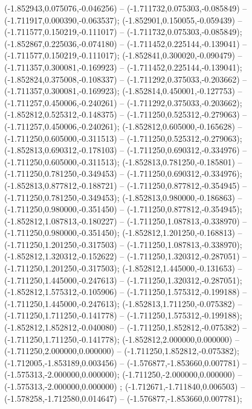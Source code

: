  (-1.852943,0.075076,-0.046256) -- (-1.711732,0.075303,-0.085849) -- (-1.711917,0.000390,-0.063537);
 (-1.852901,0.150055,-0.059439) -- (-1.711577,0.150219,-0.111017) -- (-1.711732,0.075303,-0.085849);
 (-1.852867,0.225036,-0.074180) -- (-1.711452,0.225144,-0.139041) -- (-1.711577,0.150219,-0.111017);
 (-1.852841,0.300020,-0.090479) -- (-1.711357,0.300081,-0.169923) -- (-1.711452,0.225144,-0.139041);
 (-1.852824,0.375008,-0.108337) -- (-1.711292,0.375033,-0.203662) -- (-1.711357,0.300081,-0.169923);
 (-1.852814,0.450001,-0.127753) -- (-1.711257,0.450006,-0.240261) -- (-1.711292,0.375033,-0.203662);
 (-1.852812,0.525312,-0.148375) -- (-1.711250,0.525312,-0.279063) -- (-1.711257,0.450006,-0.240261);
 (-1.852812,0.605000,-0.165628) -- (-1.711250,0.605000,-0.311513) -- (-1.711250,0.525312,-0.279063);
 (-1.852813,0.690312,-0.178103) -- (-1.711250,0.690312,-0.334976) -- (-1.711250,0.605000,-0.311513);
 (-1.852813,0.781250,-0.185801) -- (-1.711250,0.781250,-0.349453) -- (-1.711250,0.690312,-0.334976);
 (-1.852813,0.877812,-0.188721) -- (-1.711250,0.877812,-0.354945) -- (-1.711250,0.781250,-0.349453);
 (-1.852813,0.980000,-0.186863) -- (-1.711250,0.980000,-0.351450) -- (-1.711250,0.877812,-0.354945);
 (-1.852812,1.087813,-0.180227) -- (-1.711250,1.087813,-0.338970) -- (-1.711250,0.980000,-0.351450);
 (-1.852812,1.201250,-0.168813) -- (-1.711250,1.201250,-0.317503) -- (-1.711250,1.087813,-0.338970);
 (-1.852812,1.320312,-0.152622) -- (-1.711250,1.320312,-0.287051) -- (-1.711250,1.201250,-0.317503);
 (-1.852812,1.445000,-0.131653) -- (-1.711250,1.445000,-0.247613) -- (-1.711250,1.320312,-0.287051);
 (-1.852812,1.575312,-0.105906) -- (-1.711250,1.575312,-0.199188) -- (-1.711250,1.445000,-0.247613);
 (-1.852813,1.711250,-0.075382) -- (-1.711250,1.711250,-0.141778) -- (-1.711250,1.575312,-0.199188);
 (-1.852812,1.852812,-0.040080) -- (-1.711250,1.852812,-0.075382) -- (-1.711250,1.711250,-0.141778);
 (-1.852812,2.000000,0.000000) -- (-1.711250,2.000000,0.000000) -- (-1.711250,1.852812,-0.075382);
 (-1.712005,-1.853189,0.003456) -- (-1.576877,-1.853660,0.007781) -- (-1.575313,-2.000000,0.000000);
 (-1.711250,-2.000000,0.000000) -- (-1.575313,-2.000000,0.000000) ;
 (-1.712671,-1.711840,0.006503) -- (-1.578258,-1.712580,0.014647) -- (-1.576877,-1.853660,0.007781);

